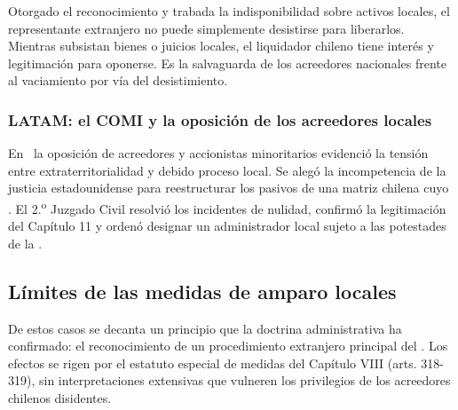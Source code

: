 \begin{foco}
Otorgado el reconocimiento y trabada la indisponibilidad sobre activos locales, el representante
extranjero no puede simplemente desistirse para liberarlos. Mientras subsistan bienes o juicios
locales, el liquidador chileno tiene interés y legitimación para oponerse. Es la salvaguarda de
los acreedores nacionales frente al vaciamiento por vía del desistimiento.
\end{foco}

\subsubsection{LATAM: el COMI y la oposición de los acreedores locales}

En \ la oposición de acreedores y accionistas minoritarios
evidenció la tensión entre extraterritorialidad y debido proceso local. Se alegó la incompetencia
de la justicia estadounidense para reestructurar los pasivos de una matriz chilena cuyo
. El 2.\textsuperscript{o}
Juzgado Civil resolvió los incidentes de nulidad, confirmó la legitimación del Capítulo 11 y
ordenó designar un administrador local sujeto a las potestades de la \superir{}.

\subsection{Límites de las medidas de amparo locales}

De estos casos se decanta un principio que la doctrina administrativa ha confirmado: el
reconocimiento de un procedimiento extranjero principal  del  . Los efectos se rigen por el
estatuto especial de medidas del Capítulo VIII (arts. 318-319), sin interpretaciones extensivas
que vulneren los privilegios de los acreedores chilenos disidentes.
